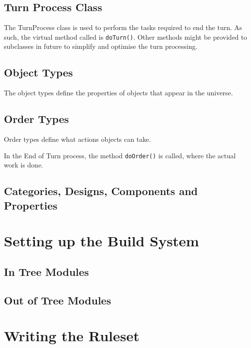 \documentclass[a4paper,11pt]{report}
\begin{document}
\section{Turn Process Class}
\label{sec:turn-process}

The TurnProcess class is used to perform the tasks required to end the turn. As such, the virtual method called is \texttt{doTurn()}.  Other methods might be provided to subclasses in future to simplify and optimise the turn processing.

\section{Object Types}
\label{sec:object-types}

The object types define the properties of objects that appear in the universe.

\section{Order Types}
\label{sec:order-types}

Order types define what actions objects can take.

In the End of Turn process, the method \texttt{doOrder()} is called, where the actual work is done.

\section{Categories, Designs, Components and Properties}
\label{sec:designs-components-properties}



\chapter{Setting up the Build System}
\label{chap:build-system}


\section{In Tree Modules}
\label{sec:intree-module-build}


\section{Out of Tree Modules}
\label{sec:outoftree-module-build}



\chapter{Writing the Ruleset}
\label{chap:ruleset-writing}
\end{document}
